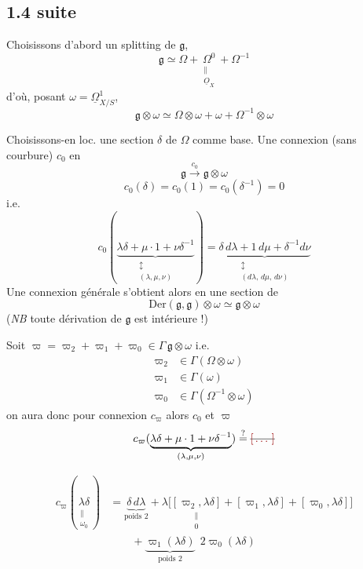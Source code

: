 \documentclass[11pt,a4paper]{article}
\begin{document}
\subsection{1.4 suite}

Choisissons d'abord un splitting de $\mathfrak{g}$, 
\[
\mathfrak{g} \simeq \Omega + \underset{\substack{\|\\ \underline{O}_X}}{\Omega^0} + \Omega^{-1}
\]
d'où, posant $\omega = \underline{\Omega}^1_{X/S}$,
\[
\mathfrak{g}\otimes\omega \simeq \Omega\otimes\omega + \omega + \Omega^{-1}\otimes\omega
\]
\struck{\ill{}}

Choisissons-en loc. une section $\delta$ de $\Omega$ comme base. Une connexion (sans courbure) $c_0$ en  
\[
\mathfrak{g} \xrightarrow{\ c_0\ } \mathfrak{g}\otimes\omega
\]
\[
c_0(\delta) = c_0(1) = c_0(\delta^{-1}) = 0
\]
i.e.
\[
c_0(\underbrace{\lambda\delta + \mu\cdot 1 + \nu\delta^{-1}}_{\substack{\updownarrow\\ (\lambda,\mu,\nu)}}) = \underbrace{\delta\,d\lambda + 1\,d\mu + \delta^{-1}d\nu}_{\substack{\updownarrow\\ (d\lambda,\,d\mu,\,d\nu)}}
\]
Une connexion générale s'obtient alors en  une section de
\[
\mathrm{Der}(\mathfrak{g},\mathfrak{g})\otimes\omega \simeq \mathfrak{g}\otimes\omega
\]
(\emph{NB} toute dérivation de $\mathfrak{g}$ est intérieure !)

Soit $\varpi = \varpi_2 + \varpi_1 + \varpi_0 \in \Gamma\,\mathfrak{g}\otimes\omega$ i.e.
\[
\begin{aligned}
\varpi_2 &\in \Gamma(\Omega\otimes\omega)\\
\varpi_1 &\in \Gamma(\omega)\\
\varpi_0 &\in \Gamma(\Omega^{-1}\otimes\omega)
\end{aligned}
\]
on aura donc pour connexion $c_{\varpi}$ alors  $c_0$ et $\varpi$
\[
c_{\varpi}(\underbrace{\lambda\delta + \mu\cdot 1 + \nu\delta^{-1}}_{(\lambda,\mu,\nu)}) \overset{?}{=} \text{\struck{\ill{}}}
\]

\[
\begin{aligned}
c_{\varpi}(\underset{\substack{\|\\ \omega_0}}{\lambda\delta}) &= \underbrace{\delta\,d\lambda}_{\text{poids } 2} + \lambda\bigl[\underset{\substack{\|\\ 0}}{[\varpi_2,\lambda\delta]} + [\varpi_1,\lambda\delta] + [\varpi_0,\lambda\delta]\bigr]\\
&\qquad + \underbrace{\varpi_1(\lambda\delta)}_{\text{poids } 2}\ \ 2\varpi_0(\lambda\delta)
\end{aligned}
\]
\end{document}
